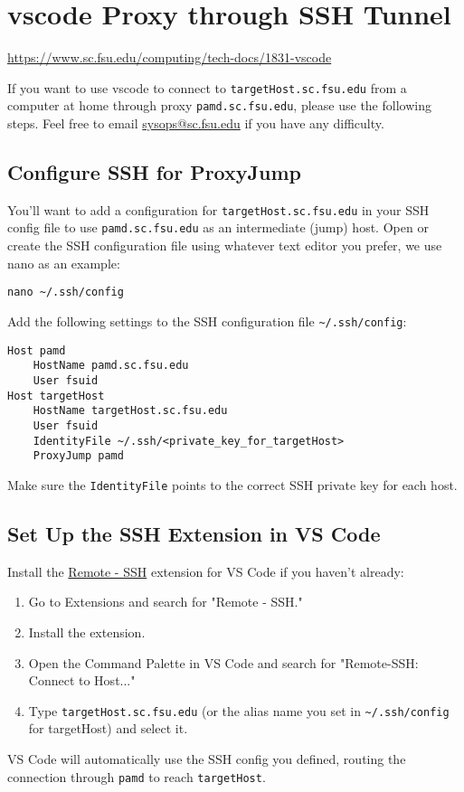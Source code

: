 \documentclass[12pt,a4paper]{article}
\begin{document}
\section{vscode Proxy through SSH Tunnel}
\url{https://www.sc.fsu.edu/computing/tech-docs/1831-vscode}

If you want to use vscode to connect to \texttt{targetHost.sc.fsu.edu} from a computer at home through proxy \texttt{pamd.sc.fsu.edu}, please use the following steps.
Feel free to email \href{mailto:sysops@sc.fsu.edu}{sysops@sc.fsu.edu} if you have any difficulty.

\subsection*{Configure SSH for ProxyJump}
You'll want to add a configuration for \texttt{targetHost.sc.fsu.edu} in your SSH config file to use \texttt{pamd.sc.fsu.edu} as an intermediate (jump) host.
Open or create the SSH configuration file using whatever text editor you prefer, we use nano as an example:
\begin{verbatim}
nano ~/.ssh/config
\end{verbatim}
Add the following settings to the SSH configuration file \texttt{\textasciitilde{}/.ssh/config}:
\begin{verbatim}
Host pamd
    HostName pamd.sc.fsu.edu
    User fsuid
Host targetHost
    HostName targetHost.sc.fsu.edu
    User fsuid
    IdentityFile ~/.ssh/<private_key_for_targetHost>
    ProxyJump pamd
\end{verbatim}
Make sure the \texttt{IdentityFile} points to the correct SSH private key for each host.

\subsection*{Set Up the SSH Extension in VS Code}
Install the \href{https://marketplace.visualstudio.com/items?itemName=ms-vscode-remote.remote-ssh}{Remote - SSH} extension for VS Code if you haven't already:
\begin{enumerate}
    \item Go to Extensions and search for "Remote - SSH."
    \item Install the extension.
    \item Open the Command Palette in VS Code and search for "Remote-SSH: Connect to Host..."
    \item Type \texttt{targetHost.sc.fsu.edu} (or the alias name you set in \texttt{\textasciitilde{}/.ssh/config} for targetHost) and select it.
\end{enumerate}
VS Code will automatically use the SSH config you defined, routing the connection through \texttt{pamd} to reach \texttt{targetHost}.
\end{document}
